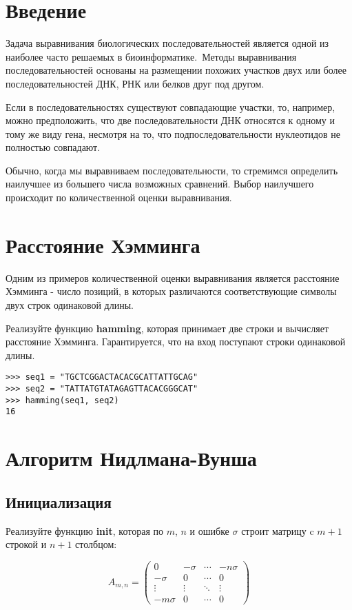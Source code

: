 \documentclass{article}
\begin{document}
\section*{Введение}

Задача выравнивания биологических последовательностей является одной из наиболее часто решаемых в биоинформатике. Методы выравнивания последовательностей основаны на размещении похожих участков двух или более последовательностей ДНК, РНК или белков друг под другом. 

Если в последовательностях существуют совпадающие участки, то, например, можно предположить, что две последовательности ДНК относятся к одному и тому же виду гена, несмотря на то, что подпоследовательности нуклеотидов не полностью совпадают.

Обычно, когда мы выравниваем последовательности, то стремимся определить наилучшее из большего числа возможных сравнений. Выбор наилучшего происходит по количественной оценки выравнивания.

\section*{Расстояние Хэмминга}

Одним из примеров количественной оценки выравнивания является расстояние Хэмминга - число позиций, в которых различаются соответствующие символы двух строк одинаковой длины.

Реализуйте функцию \textbf{hamming}, которая принимает две строки и вычисляет расстояние Хэмминга. Гарантируется, что на вход поступают строки одинаковой длины.


\begin{verbatim}
>>> seq1 = "TGCTCGGACTACACGCATTATTGCAG"
>>> seq2 = "TATTATGTATAGAGTTACACGGGCAT"
>>> hamming(seq1, seq2)
16

\end{verbatim}

\section*{Алгоритм Нидлмана-Вунша}

\subsection*{Инициализация}
Реализуйте функцию \textbf{init}, которая по $m$, $n$ и ошибке $\sigma$ строит матрицу c $m + 1$ строкой и $n + 1$ столбцом:

\begin{equation*}
A_{m,n} = \begin{pmatrix} 0 & -\sigma & \cdots & -n \sigma \\ -\sigma & 0 & \cdots & 0 \\ \vdots & \vdots & \ddots & \vdots \\ -m\sigma & 0 & \cdots & 0 \end{pmatrix}
\end{equation*}
\end{document}
